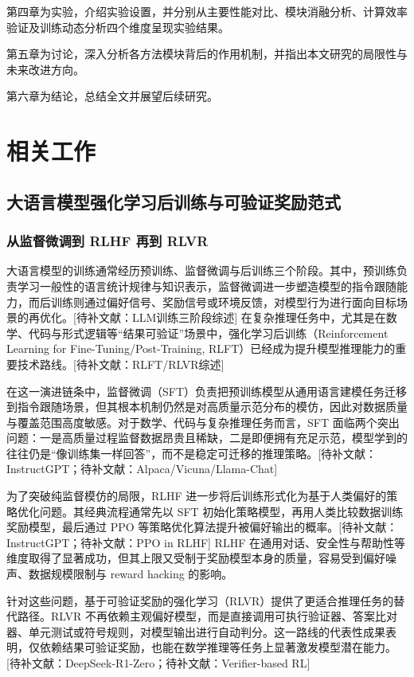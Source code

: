 第四章为实验，介绍实验设置，并分别从主要性能对比、模块消融分析、计算效率验证及训练动态分析四个维度呈现实验结果。

第五章为讨论，深入分析各方法模块背后的作用机制，并指出本文研究的局限性与未来改进方向。

第六章为结论，总结全文并展望后续研究。


\cleardoublepage
\chapter{相关工作}

\section{大语言模型强化学习后训练与可验证奖励范式}

\subsection{从监督微调到 RLHF 再到 RLVR}

大语言模型的训练通常经历预训练、监督微调与后训练三个阶段。其中，预训练负责学习一般性的语言统计规律与知识表示，监督微调进一步塑造模型的指令跟随能力，而后训练则通过偏好信号、奖励信号或环境反馈，对模型行为进行面向目标场景的再优化。[待补文献：LLM训练三阶段综述] 在复杂推理任务中，尤其是在数学、代码与形式逻辑等“结果可验证”场景中，强化学习后训练（Reinforcement Learning for Fine-Tuning/Post-Training, RLFT）已经成为提升模型推理能力的重要技术路线。[待补文献：RLFT/RLVR综述]

在这一演进链条中，监督微调（SFT）负责把预训练模型从通用语言建模任务迁移到指令跟随场景，但其根本机制仍然是对高质量示范分布的模仿，因此对数据质量与覆盖范围高度敏感。对于数学、代码与复杂推理任务而言，SFT 面临两个突出问题：一是高质量过程监督数据昂贵且稀缺，二是即便拥有充足示范，模型学到的往往仍是“像训练集一样回答”，而不是稳定可迁移的推理策略。[待补文献：InstructGPT；待补文献：Alpaca/Vicuna/Llama-Chat]

为了突破纯监督模仿的局限，RLHF 进一步将后训练形式化为基于人类偏好的策略优化问题。其经典流程通常先以 SFT 初始化策略模型，再用人类比较数据训练奖励模型，最后通过 PPO 等策略优化算法提升被偏好输出的概率。[待补文献：InstructGPT；待补文献：PPO in RLHF] RLHF 在通用对话、安全性与帮助性等维度取得了显著成功，但其上限又受制于奖励模型本身的质量，容易受到偏好噪声、数据规模限制与 reward hacking 的影响。

针对这些问题，基于可验证奖励的强化学习（RLVR）提供了更适合推理任务的替代路径。RLVR 不再依赖主观偏好模型，而是直接调用可执行验证器、答案比对器、单元测试或符号规则，对模型输出进行自动判分。这一路线的代表性成果表明，仅依赖结果可验证奖励，也能在数学推理等任务上显著激发模型潜在能力。[待补文献：DeepSeek-R1-Zero；待补文献：Verifier-based RL]

